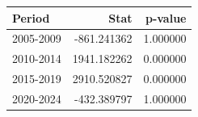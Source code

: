 \begin{tabular}{lrr}
\toprule
Period & Stat & p-value \\
\midrule
2005-2009 & -861.241362 & 1.000000 \\
2010-2014 & 1941.182262 & 0.000000 \\
2015-2019 & 2910.520827 & 0.000000 \\
2020-2024 & -432.389797 & 1.000000 \\
\bottomrule
\end{tabular}
